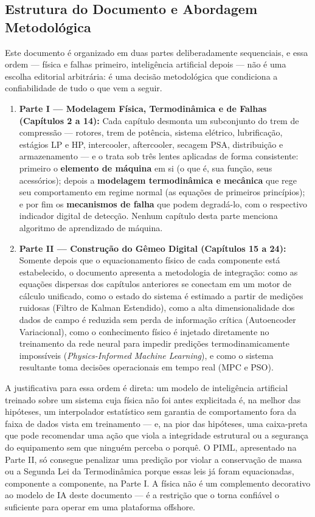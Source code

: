 \documentclass[12pt,a4paper]{article}
\numberwithin{equation}{section}
\numberwithin{table}{section}
\numberwithin{figure}{section}
\begin{document}
	\subsection{\textbf{Estrutura do Documento e Abordagem Metodológica}}
	Este documento é organizado em duas partes deliberadamente sequenciais, e essa ordem — física e falhas primeiro, inteligência artificial depois — não é uma escolha editorial arbitrária: é uma decisão metodológica que condiciona a confiabilidade de tudo o que vem a seguir.

	\begin{enumerate}
		\item \textbf{Parte I — Modelagem Física, Termodinâmica e de Falhas (Capítulos 2 a 14):} Cada capítulo desmonta um subconjunto do trem de compressão — rotores, trem de potência, sistema elétrico, lubrificação, estágios LP e HP, intercooler, aftercooler, secagem PSA, distribuição e armazenamento — e o trata sob três lentes aplicadas de forma consistente: primeiro o \textbf{elemento de máquina} em si (o que é, sua função, seus acessórios); depois a \textbf{modelagem termodinâmica e mecânica} que rege seu comportamento em regime normal (as equações de primeiros princípios); e por fim os \textbf{mecanismos de falha} que podem degradá-lo, com o respectivo indicador digital de detecção. Nenhum capítulo desta parte menciona algoritmo de aprendizado de máquina.
		\item \textbf{Parte II — Construção do Gêmeo Digital (Capítulos 15 a 24):} Somente depois que o equacionamento físico de cada componente está estabelecido, o documento apresenta a metodologia de integração: como as equações dispersas dos capítulos anteriores se conectam em um motor de cálculo unificado, como o estado do sistema é estimado a partir de medições ruidosas (Filtro de Kalman Estendido), como a alta dimensionalidade dos dados de campo é reduzida sem perda de informação crítica (Autoencoder Variacional), como o conhecimento físico é injetado diretamente no treinamento da rede neural para impedir predições termodinamicamente impossíveis (\textit{Physics-Informed Machine Learning}), e como o sistema resultante toma decisões operacionais em tempo real (MPC e PSO).
	\end{enumerate}

	A justificativa para essa ordem é direta: um modelo de inteligência artificial treinado sobre um sistema cuja física não foi antes explicitada é, na melhor das hipóteses, um interpolador estatístico sem garantia de comportamento fora da faixa de dados vista em treinamento — e, na pior das hipóteses, uma caixa-preta que pode recomendar uma ação que viola a integridade estrutural ou a segurança do equipamento sem que ninguém perceba o porquê. O PIML, apresentado na Parte II, só consegue penalizar uma predição por violar a conservação de massa ou a Segunda Lei da Termodinâmica porque essas leis já foram equacionadas, componente a componente, na Parte I. A física não é um complemento decorativo ao modelo de IA deste documento — é a restrição que o torna confiável o suficiente para operar em uma plataforma offshore.
\end{document}
